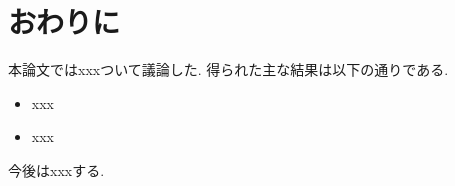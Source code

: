 \chapter{おわりに}
本論文ではxxxついて議論した. 
得られた主な結果は以下の通りである. 
\begin{itemize}
 \item xxx
 \item xxx
\end{itemize}

今後はxxxする. 

\begin{center}
\end{center}